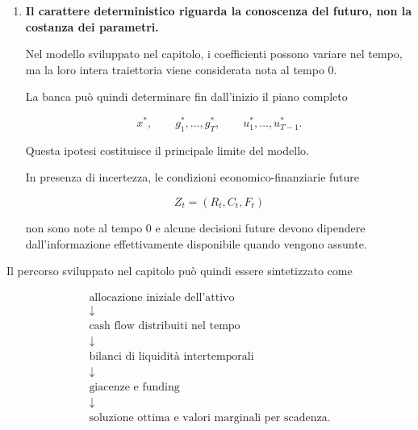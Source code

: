 \begin{enumerate}
\[
\lambda_t^*,
\]

che misura localmente l'effetto sul valore ottimo di una variazione del
fabbisogno alla data $t$:

\[
\Delta\Pi^*
\approx
-\lambda_t^*\,\Delta d_t.
\]

Nel caso SVB, i valori marginali differiscono tra le date. La liquidit\`a non
ha quindi un unico valore economico indipendente dalla scadenza.

Analogamente, il valore duale associato al limite

\[
u_t\leq\bar u_t
\]

misura il beneficio marginale di una maggiore capacit\`a di funding.

Queste interpretazioni sono locali: variazioni sufficientemente ampie dei
parametri possono modificare la struttura della soluzione ottima e quindi
anche i corrispondenti valori marginali.

\item \textbf{Il carattere deterministico riguarda la conoscenza del futuro,
non la costanza dei parametri.}

Nel modello sviluppato nel capitolo, i coefficienti possono variare nel tempo,
ma la loro intera traiettoria viene considerata nota al tempo $0$.

La banca pu\`o quindi determinare fin dall'inizio il piano completo

\[
x^*,
\qquad
g_1^*,\ldots,g_T^*,
\qquad
u_1^*,\ldots,u_{T-1}^*.
\]

Questa ipotesi costituisce il principale limite del modello.

In presenza di incertezza, le condizioni economico-finanziarie future

\[
Z_t=(R_t,C_t,F_t)
\]

non sono note al tempo $0$ e alcune decisioni future devono dipendere
dall'informazione effettivamente disponibile quando vengono assunte.

\end{enumerate}

Il percorso sviluppato nel capitolo pu\`o quindi essere sintetizzato come

\[
\boxed{
\begin{array}{c}
\text{allocazione iniziale dell'attivo}
\\[3pt]
\downarrow
\\[3pt]
\text{cash flow distribuiti nel tempo}
\\[3pt]
\downarrow
\\[3pt]
\text{bilanci di liquidit\`a intertemporali}
\\[3pt]
\downarrow
\\[3pt]
\text{giacenze e funding}
\\[3pt]
\downarrow
\\[3pt]
\text{soluzione ottima e valori marginali per scadenza}.
\end{array}
}
\]

